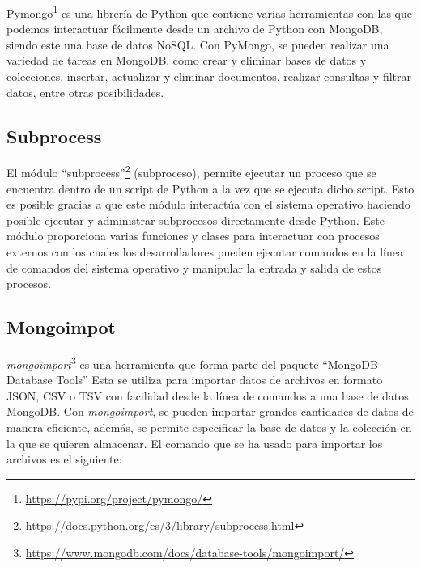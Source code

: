 \documentclass[a4paper, 12pt]{book}
\begin{document}
Pymongo\footnote{\url{https://pypi.org/project/pymongo/}} es una librería de Python que contiene varias herramientas con las que podemos interactuar fácilmente desde un archivo de Python con MongoDB, siendo este una base de datos NoSQL. 
Con PyMongo, se pueden realizar una variedad de tareas en MongoDB, como crear y eliminar bases de datos y colecciones, insertar, actualizar y eliminar documentos, realizar consultas y filtrar datos, entre otras posibilidades.


\subsection{Subprocess} %
\label{sec:subprocess} %
El módulo ``subprocess''\footnote{\url{https://docs.python.org/es/3/library/subprocess.html}} (subproceso), permite ejecutar un proceso que se encuentra dentro de un script de Python a la vez que se ejecuta dicho script.
Esto es posible gracias a que este módulo interactúa con el sistema operativo haciendo posible ejecutar y administrar subprocesos directamente desde Python. 
Este módulo proporciona varias funciones y clases para interactuar con procesos externos con los cuales los desarrolladores pueden ejecutar comandos en la línea de comandos del sistema operativo y manipular la entrada y salida de estos procesos.

\subsection{Mongoimpot} %
\label{sec:mongoimport} %

\emph{mongoimport}\footnote{\url{https://www.mongodb.com/docs/database-tools/mongoimport/}} es una herramienta que forma parte del paquete ``MongoDB Database Tools''
Esta se utiliza para importar datos de archivos en formato JSON, CSV o TSV con facilidad desde la línea de comandos a una base de datos MongoDB. 
Con \emph{mongoimport}, se pueden importar grandes cantidades de datos de manera eficiente, además, se permite especificar la base de datos y la colección en la que se quieren almacenar.
El comando que se ha usado para importar los archivos es el siguiente:
\end{document}
